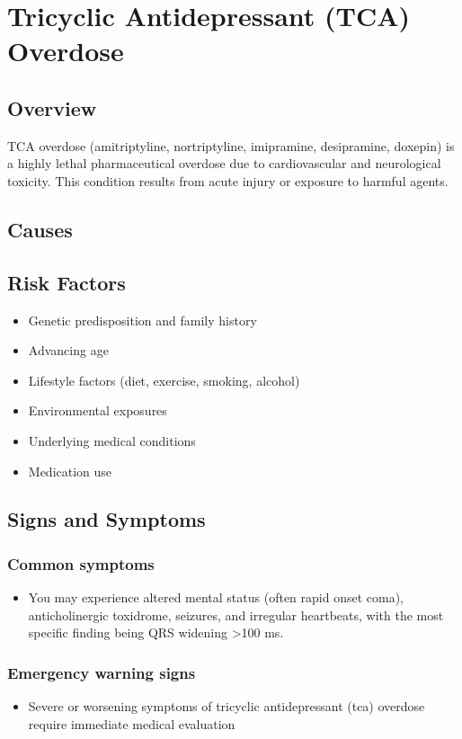 \chapter{Tricyclic Antidepressant (TCA) Overdose}
\label{sec:TCA Overdose}

\section{Overview}
TCA overdose (amitriptyline, nortriptyline, imipramine, desipramine, doxepin) is a highly lethal pharmaceutical overdose due to cardiovascular and neurological toxicity. This condition results from acute injury or exposure to harmful agents.
\section{Causes}
\section{Risk Factors}

\begin{itemize}[noitemsep]
  \item Genetic predisposition and family history
  \item Advancing age
  \item Lifestyle factors (diet, exercise, smoking, alcohol)
  \item Environmental exposures
  \item Underlying medical conditions
  \item Medication use
\end{itemize}
\section{Signs and Symptoms}

\subsection{Common symptoms}
\begin{itemize}[noitemsep]
  \item You may experience altered mental status (often rapid onset coma), anticholinergic toxidrome, seizures, and irregular heartbeats, with the most specific finding being QRS widening >100 ms. 
  \end{itemize}

\subsection{Emergency warning signs}
\begin{itemize}[noitemsep]
  \item Severe or worsening symptoms of tricyclic antidepressant (tca) overdose require immediate medical evaluation
\end{itemize}
